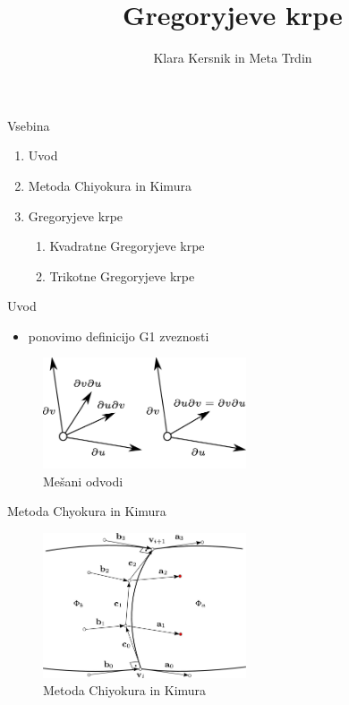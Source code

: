 \documentclass[a4paper,8pt]{beamer}
\title{Gregoryjeve krpe}
\author{Klara Kersnik in Meta Trdin} %
\institute[FMF]{Fakulteta za matematiko in fiziko}
\date{}
\begin{document}
\begin{frame}
\maketitle
\end{frame}

\begin{frame}{Vsebina}

\begin{enumerate}
	\item Uvod
	\item Metoda Chiyokura in Kimura
	\item Gregoryjeve krpe
	\begin{enumerate}
		\item Kvadratne Gregoryjeve krpe
		\item Trikotne Gregoryjeve krpe
	\end{enumerate}
\end{enumerate}

\end{frame}

\begin{frame}{Uvod}
\begin{itemize}
	\item ponovimo definicijo G1 zveznosti
\end{itemize}

\begin{figure}[h]
	\centering
	\includegraphics[width=6cm]{mesani_odvodi_ob.jpg}
	\caption{Mešani odvodi}
\end{figure}
\end{frame}


\begin{frame}{Metoda Chyokura in Kimura}
	
\end{frame}
\begin{frame}
	\begin{figure}[h]
		\centering
		\includegraphics[width=6cm]{metoda_CinK.jpg}
		\caption{Metoda Chiyokura in Kimura}
	\end{figure}
\end{frame}
\end{document}
